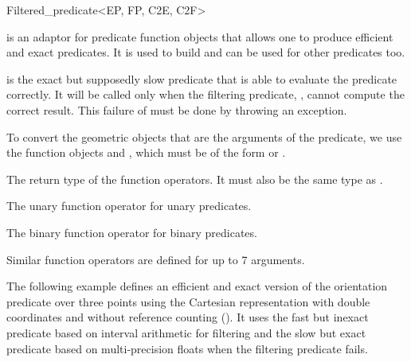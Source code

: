 \begin{ccRefClass}{Filtered_predicate<EP, FP, C2E, C2F>}

\KernelRefLayout\gdef\ccTagOperatorLayout{\ccFalse}

\ccDefinition

\ccClassTemplateName is an adaptor for predicate function objects that allows
one to produce efficient and exact predicates.  It is used to build
 and can be used for other
predicates too.

 is the exact but supposedly slow predicate that is able to evaluate
the predicate correctly.  It will be called only when the filtering predicate,
, cannot compute the correct result.  This failure of  must be
done by throwing an exception.

To convert the geometric objects that are the arguments of the predicate,
we use the function objects  and , which must be of the form
 or .


\ccTypes
{}
{ The return type of the function operators.
  It must also be the same type as .}

\ccCreation
{}


\ccOperations

{ The unary function operator for unary predicates. }

{ The binary function operator for binary predicates. }

Similar function operators are defined for up to 7 arguments.

\ccExample

The following example defines an efficient and exact version of the
orientation predicate over three points using the Cartesian representation
with double coordinates and without reference counting
().
It uses the fast but inexact predicate based on interval arithmetic for
filtering and the slow but exact predicate based on multi-precision floats
when the filtering predicate fails.


\end{ccRefClass}
